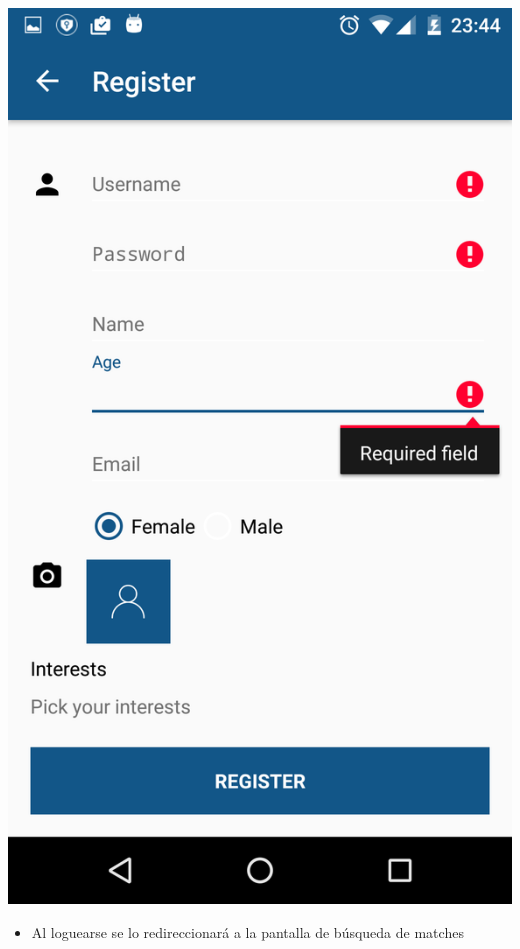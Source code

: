 \documentclass[letterpaper,10pt,english]{sphinxmanual}
\begin{document}
\includegraphics{registro_failed.png}
\begin{itemize}
\item {} 
Al loguearse se lo redireccionará a la pantalla de búsqueda de matches

\end{itemize}
\end{document}
